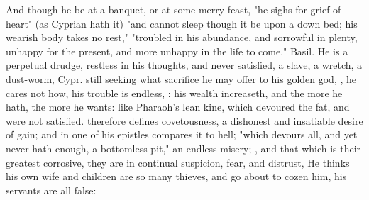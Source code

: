And though he be at a banquet, or at some merry feast, "he sighs for grief of
heart" (as Cyprian hath it) "and cannot sleep though it be
upon a down bed; his wearish body takes no rest,"
"troubled in his abundance, and sorrowful in plenty,
unhappy for the present, and more unhappy in the life to come." Basil. He is a
perpetual drudge, restless in his thoughts, and never
satisfied, a slave, a wretch, a dust-worm,  Cypr.  still seeking
what sacrifice he may offer to his golden god, , he cares
not how, his trouble is endless, : his wealth increaseth, and the more
he hath, the more he wants: like Pharaoh's lean kine,
which devoured the fat, and were not satisfied. \Austin{}
therefore defines covetousness,  a dishonest and insatiable desire of gain; and in one
of his epistles compares it to hell; "which devours all,
and yet never hath enough, a bottomless pit," an endless misery; , and that which is
their greatest corrosive, they are in continual suspicion, fear, and distrust,
He thinks his own wife and children are so many thieves, and go about to cozen
him, his servants are all false:


